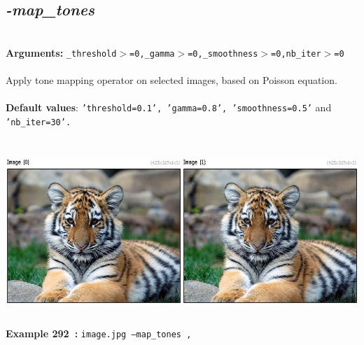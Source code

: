 \documentclass[a4paper,11pt,twoside]{book}
\begin{document}
\subsection{\emph{-map\_tones} }\vspace*{-0.5em}
~\\\textbf{Arguments: } 
{\small \texttt{\_threshold$>$=0,\_gamma$>$=0,\_smoothness$>$=0,nb\_iter$>$=0}}\\~\\
Apply tone mapping operator on selected images, based on Poisson equation.
~\\~\\\textbf{Default values}: {\small \texttt{'threshold=0.1', 'gamma=0.8', 'smoothness=0.5'} and \texttt{'nb\_iter=30'.}}
\begin{center}\includegraphics[keepaspectratio=true,height=7cm,width=\textwidth]{img/gmic_def292.jpg}\\
{\footnotesize \textbf{Example 292~:} \texttt{image.jpg --map\_tones ,}}
\end{center}
\end{document}
